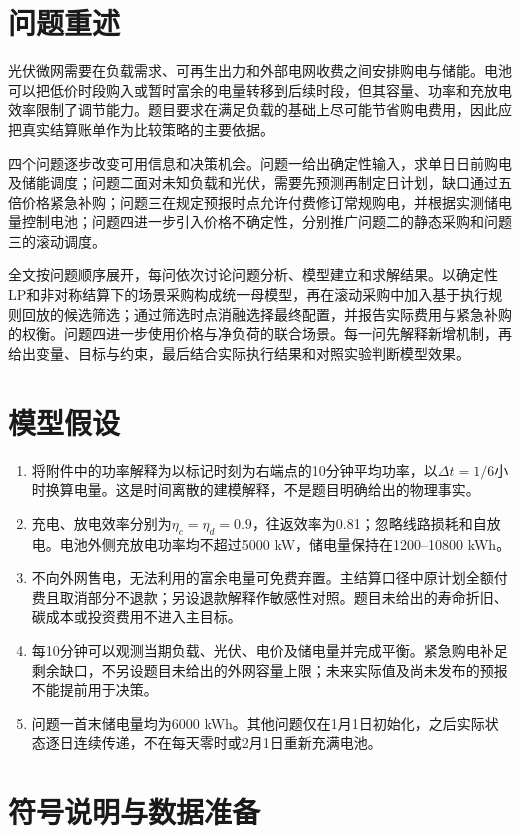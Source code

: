 \section{问题重述}

光伏微网需要在负载需求、可再生出力和外部电网收费之间安排购电与储能。电池可以把低价时段购入或暂时富余的电量转移到后续时段，但其容量、功率和充放电效率限制了调节能力。题目要求在满足负载的基础上尽可能节省购电费用，因此应把真实结算账单作为比较策略的主要依据。

四个问题逐步改变可用信息和决策机会。问题一给出确定性输入，求单日日前购电及储能调度；问题二面对未知负载和光伏，需要先预测再制定日计划，缺口通过五倍价格紧急补购；问题三在规定预报时点允许付费修订常规购电，并根据实测储电量控制电池；问题四进一步引入价格不确定性，分别推广问题二的静态采购和问题三的滚动调度。

全文按问题顺序展开，每问依次讨论问题分析、模型建立和求解结果。以确定性LP和非对称结算下的场景采购构成统一母模型，再在滚动采购中加入基于执行规则回放的候选筛选；通过筛选时点消融选择最终配置，并报告实际费用与紧急补购的权衡。问题四进一步使用价格与净负荷的联合场景。每一问先解释新增机制，再给出变量、目标与约束，最后结合实际执行结果和对照实验判断模型效果。

\section{模型假设}

\begin{enumerate}
 \item 将附件中的功率解释为以标记时刻为右端点的10分钟平均功率，以$\Delta t=1/6$小时换算电量。这是时间离散的建模解释，不是题目明确给出的物理事实。
 \item 充电、放电效率分别为$\eta_c=\eta_d=0.9$，往返效率为0.81；忽略线路损耗和自放电。电池外侧充放电功率均不超过5000 kW，储电量保持在1200--10800 kWh。
 \item 不向外网售电，无法利用的富余电量可免费弃置。主结算口径中原计划全额付费且取消部分不退款；另设退款解释作敏感性对照。题目未给出的寿命折旧、碳成本或投资费用不进入主目标。
 \item 每10分钟可以观测当期负载、光伏、电价及储电量并完成平衡。紧急购电补足剩余缺口，不另设题目未给出的外网容量上限；未来实际值及尚未发布的预报不能提前用于决策。
 \item 问题一首末储电量均为6000 kWh。其他问题仅在1月1日初始化，之后实际状态逐日连续传递，不在每天零时或2月1日重新充满电池。
\end{enumerate}

\section{符号说明与数据准备}

